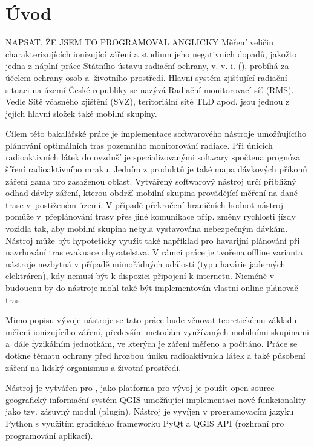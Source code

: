 \chapter{Úvod}
\label{1-uvod}
NAPSAT, ŽE JSEM TO PROGRAMOVAL ANGLICKY
Měření veličin charakterizujících ionizující záření a studium jeho negativních dopadů, jakožto jedna z náplní práce Státního ústavu radiační ochrany, v. v. i. (), probíhá za účelem ochrany osob a~životního prostředí. %
Hlavní systém zjišťující radiační situaci na území České republiky se nazývá Radiační monitorovací síť (RMS). Vedle Sítě včasného zjištění (SVZ), teritoriální sítě TLD apod. jsou jednou z jejích hlavní složek také mobilní skupiny.

Cílem této bakalářské práce je implementace softwarového nástroje umožňujícího plánování optimálních tras pozemního monitorování radiace. Při únicích radioaktivních látek do ovzduší je specializovanými softwary spočtena prognóza šíření radioaktivního mraku. Jedním z produktů je také mapa dávkových příkonů záření gama pro zasaženou oblast. Vytvářený softwarový nástroj určí přibližný odhad dávky záření, kterou obdrží mobilní skupina provádějící měření na dané trase v~postiženém území. V případě překročení hraničních hodnot nástroj pomůže v~přeplánování trasy přes jiné komunikace příp. změny rychlosti jízdy vozidla tak, aby mobilní skupina nebyla vystavována nebezpečným dávkám. 
Nástroj může být hypoteticky využit také například pro havarijní plánování při navrhování tras evakuace obyvatelstva. V rámci práce je tvořena offline varianta nástroje nezbytná v případě mimořádných událostí (typu havárie jaderných elektráren), kdy nemusí být k dispozici připojení k internetu. Nicméně v budoucnu by do nástroje mohl také být implementován vlastní online plánovač tras. 

Mimo popisu vývoje nástroje se tato práce bude věnovat teoretickému základu měření ionizujícího záření, především metodám využívaných mobilními skupinami a~dále fyzikálním jednotkám, ve kterých je záření měřeno a počítáno. Práce se  dotkne tématu ochrany před hrozbou úniku radioaktivních látek a také působení záření na lidský organismus a životní prostředí.

Nástroj je vytvářen pro , jako platforma pro vývoj je použit open source geografický informační systém QGIS umožňující implementaci nové funkcionality jako tzv. zásuvný modul (plugin). Nástroj je vyvíjen v programovacím jazyku Python s využitím grafického frameworku PyQt a QGIS API (rozhraní pro programování aplikací).    







